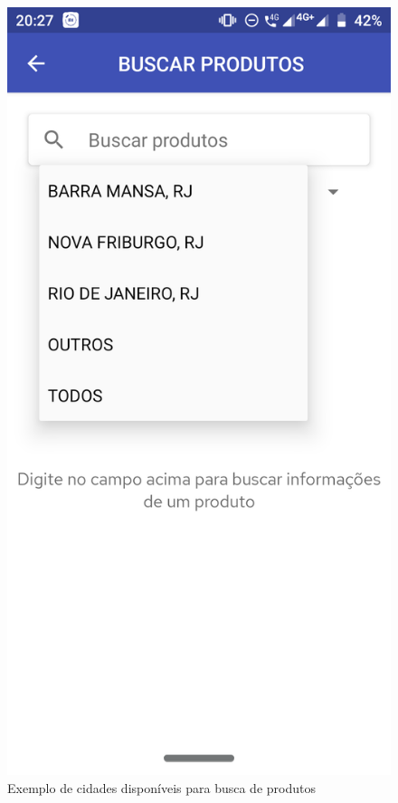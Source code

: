 \begin{figure}[h]
    \centering
    \includegraphics[scale=0.15]{tcc/figures/app/app_buscar_produtos_cidades.png}
    \caption{Exemplo de cidades disponíveis para busca de produtos}
    \label{appBuscaProdutosCidadesFig}
\end{figure}

